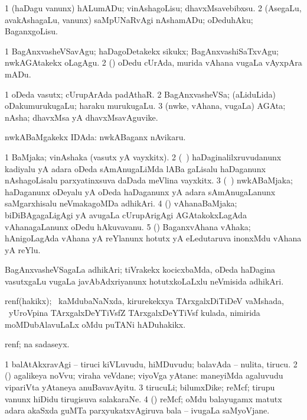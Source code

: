 \begin{center}
\bentry
{} 
\gl{\sakirx}
\expl{}
\bmng
\bnum
\num{1} (haDagu \mo vanunx) hALumADu; vinAshagoLisu; dhavxMsavebibxsu. 
\num{2} (AsegaLu, avakAshagaLu, \mo vanunx) saMpUNaRvAgi nAshamADu; oDeduhAku; BaganxgoLisu. 
\enum
\emng

\noindent
\gl{\akirx}
\expl{}
\bmng
\bnum
\num{1} BagAnxvasheVSavAgu; haDagoDetakekx sikukx; BagAnxvashiSaTxvAgu; nwkAGAtakekx oLagAgu. 
\num{2} (\ame) oDedu cUrAda, murida vAhana \mo vugaLa vAyxpAra mADu. 
\enum
\emng
\eentry

\bentry
{} 
\gl{\nA}
\expl{}
\bmng
\bnum
\num{1} oDeda vasutx; cUrupArAda padAthaR. 
\num{2} BagAnxvasheVSa; (aLiduLida) oDakumurukugaLu; haraku murukugaLu. 
\num{3} (nwke, vAhana, \mo vugaLa) AGAta; nAsha; dhavxMsa yA dhavxMsavAguvike. 
\enum
\emng
\eentry

\bentry
{} 
\gl{\gu}
\expl{}
\bmng
nwkABaMgakekx IDAda:  nwkABaganx nAvikaru. 
\emng
\eentry

\bentry
{} 
\gl{\nA}
\expl{}
\bmng
\bnum
\num{1} BaMjaka; vinAshaka (vasutx yA vayxkitx). 
\num{2} (\kanmu\ \ca) haDaginalilxruvudanunx kadiyalu yA adara oDeda sAmAnugaLiMda lABa gaLisalu haDaganunx nAshagoLisalu parxyatinxsuva daDada meVlina vayxkitx. 
\num{3} (\kanmu\ \ame) nwkABaMjaka; haDaganunx oDeyalu yA oDeda haDaganunx yA adara sAmAnugaLanunx saMgarxhisalu neVmakagoMDa adhikAri. 
\num{4} (\ame) vAhanaBaMjaka; biDiBAgagaLigAgi yA avugaLa cUrupArigAgi AGAtakokxLagAda vAhanagaLanunx oDedu hAkuvavanu. 
\num{5} (\ame) BaganxvAhana vAhaka; hAnigoLagAda vAhana yA reYlanunx hotutx yA eLedutaruva inonxMdu vAhana yA reYlu. 
\enum
\emng
\eentry

\bentry
{} 
\gl{\nA}
\expl{}
\bmng
BagAnxvasheVSagaLa adhikAri; tiVrakekx kocicxbaMda, oDeda haDagina vasutxgaLu \mo vugaLa javAbAdxriyanunx hotutxkoLaLxlu neVmisida adhikAri. 
\emng
\eentry

\bentry 
{} 
\gl{\nA}
\expl{}
\bmng
renf(hakikx); \sA\ kaMdubaNaNxda, kirurekekxya TArxgalxDiTiDeV vaMshada, \kanmu\ yUroVpina TArxgalxDeYTiVsfZ TArxgalxDeYTiVsf kulada, nimirida moMDubAlavuLaLx oMdu puTANi hADuhakikx. 
\emng
\eentry

\bentry 
{} 
\gl{\nA}
\expl{}
\bmng
renf; \eng{(\UK)}  na sadaseyx. 
\emng
\eentry

\bentry
{} 
\gl{\nA}
\expl{}
\bmng
\bnum
\num{1} balAtAkxravAgi -- tiruci kiVLuvudu, hiMDuvudu; balavAda -- nulita, tirucu. 
\num{2} (\rUpa) agalikeya noVvu; viraha veVdane; viyoVga yAtane:  maneyiMda agaluvudu vipariVta yAtaneya anuBavavAyitu. 
\num{3} tirucuLi; bilumxDike; reMcf; tirupu \mo vanunx hiDidu tirugisuva salakaraNe. 
\num{4} (\Bwvi) reMcf; oMdu balayugamx  matutx adara akaSxda guMTa parxyukatxvAgiruva bala -- ivugaLa saMyoVjane. 
\enum
\emng
\eentry


\end{center}
